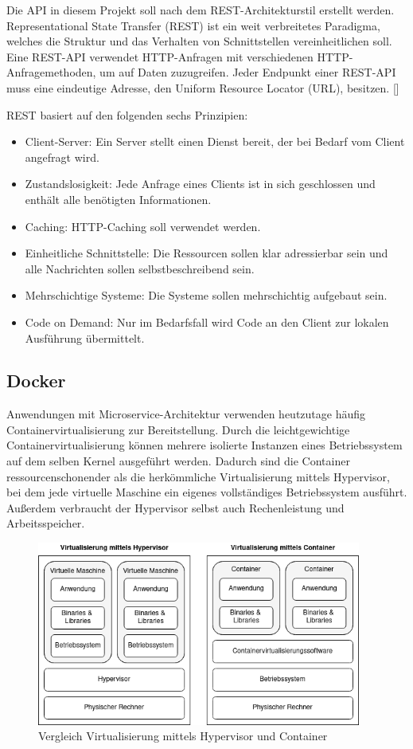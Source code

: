 Die API in diesem Projekt soll nach dem REST-Architekturstil erstellt werden. Representational State Transfer (REST) ist ein weit verbreitetes Paradigma, welches die Struktur und das Verhalten von Schnittstellen vereinheitlichen soll. Eine REST-API verwendet HTTP-Anfragen mit verschiedenen HTTP-Anfragemethoden, um auf Daten zuzugreifen. Jeder Endpunkt einer REST-API muss eine eindeutige Adresse, den Uniform Resource Locator (URL), besitzen. [\cite[S. 76ff]{fieldingArchitectural2000}]

REST basiert auf den folgenden sechs Prinzipien:
\begin{itemize}
\item Client-Server: Ein Server stellt einen Dienst bereit, der bei Bedarf vom Client angefragt wird.
\item Zustandslosigkeit: Jede Anfrage eines Clients ist in sich geschlossen und enthält alle benötigten Informationen.
\item Caching: HTTP-Caching soll verwendet werden.
\item Einheitliche Schnittstelle: Die Ressourcen sollen klar adressierbar sein und alle Nachrichten sollen selbstbeschreibend sein.
\item Mehrschichtige Systeme: Die Systeme sollen mehrschichtig aufgebaut sein.
\item Code on Demand: Nur im Bedarfsfall wird Code an den Client zur lokalen Ausführung übermittelt.
\end{itemize}


\subsection{Docker}

Anwendungen mit Microservice-Architektur verwenden heutzutage häufig Containervirtualisierung zur Bereitstellung. Durch die leichtgewichtige Containervirtualisierung können mehrere isolierte Instanzen eines Betriebssystem auf dem selben Kernel ausgeführt werden. Dadurch sind die Container ressourcenschonender als die herkömmliche Virtualisierung mittels Hypervisor, bei dem jede virtuelle Maschine ein eigenes vollständiges Betriebssystem ausführt. Außerdem verbraucht der Hypervisor selbst auch Rechenleistung und Arbeitsspeicher.

\begin{figure}[H] 
    \centering
    \includegraphics[width=0.95\textwidth]{figures/containervirtualisierung.png}
    \caption{Vergleich Virtualisierung mittels Hypervisor und Container}
\end{figure}

